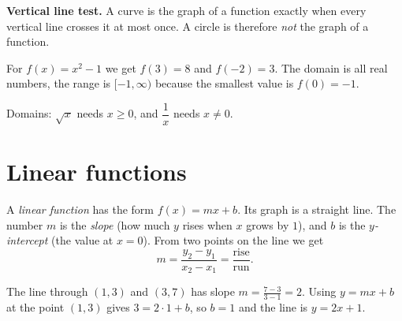 \textbf{Vertical line test.} A curve is the graph of a function exactly when every vertical line crosses it at most once. A circle is therefore \emph{not} the graph of a function.

\begin{example}
For $f(x)=x^2-1$ we get $f(3)=8$ and $f(-2)=3$. The domain is all real numbers, the range is $[-1,\infty)$ because the smallest value is $f(0)=-1$.
\end{example}

\begin{example}
Domains: $\sqrt{x}$ needs $x\ge0$, and $\dfrac1x$ needs $x\neq0$.
\end{example}

\section*{Linear functions}
A \emph{linear function} has the form $f(x)=mx+b$. Its graph is a straight line. The number $m$ is the \emph{slope} (how much $y$ rises when $x$ grows by $1$), and $b$ is the \emph{$y$-intercept} (the value at $x=0$). From two points on the line we get
\[
m=\frac{y_2-y_1}{x_2-x_1}=\frac{\text{rise}}{\text{run}}.
\]

\begin{center}

\label{fig:b1_3}
\end{center}

\begin{example}
The line through $(1,3)$ and $(3,7)$ has slope $m=\frac{7-3}{3-1}=2$. Using $y=mx+b$ at the point $(1,3)$ gives $3=2\cdot1+b$, so $b=1$ and the line is $y=2x+1$.
\end{example}


